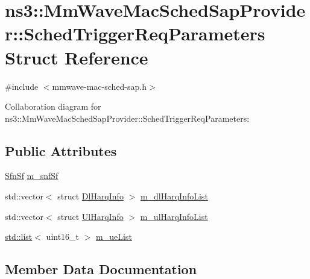 \hypertarget{structns3_1_1MmWaveMacSchedSapProvider_1_1SchedTriggerReqParameters}{}\section{ns3\+:\+:Mm\+Wave\+Mac\+Sched\+Sap\+Provider\+:\+:Sched\+Trigger\+Req\+Parameters Struct Reference}
\label{structns3_1_1MmWaveMacSchedSapProvider_1_1SchedTriggerReqParameters}


{\ttfamily \#include $<$mmwave-\/mac-\/sched-\/sap.\+h$>$}



Collaboration diagram for ns3\+:\+:Mm\+Wave\+Mac\+Sched\+Sap\+Provider\+:\+:Sched\+Trigger\+Req\+Parameters\+:
\subsection*{Public Attributes}
\begin{DoxyCompactItemize}
\item 
\hyperlink{structns3_1_1SfnSf}{Sfn\+Sf} \hyperlink{structns3_1_1MmWaveMacSchedSapProvider_1_1SchedTriggerReqParameters_a100fc28494012ca5e37c181fd0c3ee31}{m\+\_\+snf\+Sf}
\item 
std\+::vector$<$ struct \hyperlink{structns3_1_1DlHarqInfo}{Dl\+Harq\+Info} $>$ \hyperlink{structns3_1_1MmWaveMacSchedSapProvider_1_1SchedTriggerReqParameters_a3c8682401812747f5bf308a637a31d60}{m\+\_\+dl\+Harq\+Info\+List}
\item 
std\+::vector$<$ struct \hyperlink{structns3_1_1UlHarqInfo}{Ul\+Harq\+Info} $>$ \hyperlink{structns3_1_1MmWaveMacSchedSapProvider_1_1SchedTriggerReqParameters_ab8392720748eefb0b48e1e52c02c98dd}{m\+\_\+ul\+Harq\+Info\+List}
\item 
\hyperlink{openflow-interface_8h_afd9bcfa176617760671b67580f536fa7}{std\+::list}$<$ uint16\+\_\+t $>$ \hyperlink{structns3_1_1MmWaveMacSchedSapProvider_1_1SchedTriggerReqParameters_a8445c12d274604698fae3fe8401afaaf}{m\+\_\+ue\+List}
\end{DoxyCompactItemize}


\subsection{Member Data Documentation}
